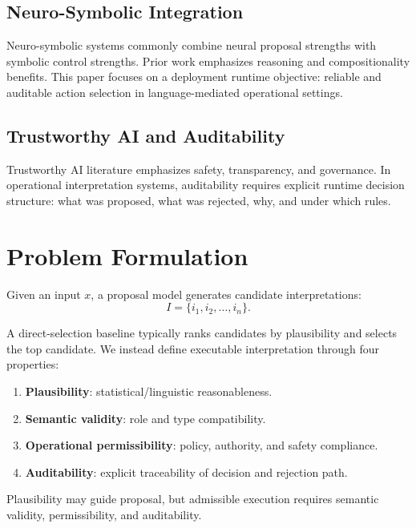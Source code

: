 \documentclass[11pt,a4paper]{article}
\begin{document}
\subsection{Neuro-Symbolic Integration}
Neuro-symbolic systems commonly combine neural proposal strengths with symbolic control strengths. Prior work emphasizes reasoning and compositionality benefits. This paper focuses on a deployment runtime objective: reliable and auditable action selection in language-mediated operational settings.

\subsection{Trustworthy AI and Auditability}
Trustworthy AI literature emphasizes safety, transparency, and governance. In operational interpretation systems, auditability requires explicit runtime decision structure: what was proposed, what was rejected, why, and under which rules.

\section{Problem Formulation}

Given an input $x$, a proposal model generates candidate interpretations:
\[
I = \{i_1, i_2, \dots, i_n\}.
\]

A direct-selection baseline typically ranks candidates by plausibility and selects the top candidate. We instead define executable interpretation through four properties:
\begin{enumerate}[leftmargin=*, itemsep=2pt]
  \item \textbf{Plausibility}: statistical/linguistic reasonableness.
  \item \textbf{Semantic validity}: role and type compatibility.
  \item \textbf{Operational permissibility}: policy, authority, and safety compliance.
  \item \textbf{Auditability}: explicit traceability of decision and rejection path.
\end{enumerate}

Plausibility may guide proposal, but admissible execution requires semantic validity, permissibility, and auditability.

\end{document}
